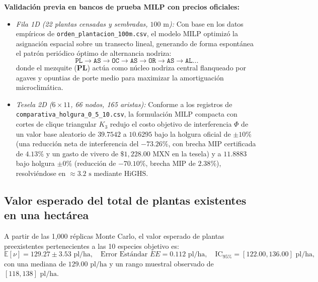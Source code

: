 \documentclass[11pt,a4paper]{article}
\begin{document}
\textbf{Validación previa en bancos de prueba MILP con precios oficiales:}
\begin{itemize}[leftmargin=1.5em]
    \item \textit{Fila 1D (22 plantas censadas y sembradas, $100\text{ m}$):} Con base en los datos empíricos de \texttt{orden\_plantacion\_100m.csv}, el modelo MILP optimizó la asignación espacial sobre un transecto lineal, generando de forma espontánea el patrón periódico óptimo de alternancia nodriza:
    \begin{equation}
    \texttt{PL} \longrightarrow \texttt{AS} \longrightarrow \texttt{OC} \longrightarrow \texttt{AS} \longrightarrow \texttt{OR} \longrightarrow \texttt{AS} \longrightarrow \texttt{AL} \dots
    \end{equation}
    donde el mezquite (\textbf{PL}) actúa como núcleo nodriza central flanqueado por agaves y opuntias de porte medio para maximizar la amortiguación microclimática.
    \item \textit{Tesela 2D ($6\times 11$, 66 nodos, 165 aristas):} Conforme a los registros de \texttt{comparativa\_holgura\_0\_5\_10.csv}, la formulación MILP compacta con cortes de clique triangular $K_3$ redujo el costo objetivo de interferencia $\Phi$ de un valor base aleatorio de $\mathbf{39.7542}$ a $\mathbf{10.6295}$ bajo la holgura oficial de $\pm 10\%$ (una reducción neta de interferencia del \textbf{$-73.26\%$}, con brecha MIP certificada de $\mathbf{4.13\%}$ y un gasto de vivero de $\$1,228.00\text{ MXN}$ en la tesela) y a $\mathbf{11.8883}$ bajo holgura $\pm 0\%$ (reducción de \textbf{$-70.10\%$}, brecha MIP de $\mathbf{2.38\%}$), resolviéndose en $\approx 3.2\text{ s}$ mediante HiGHS.
\end{itemize}

\subsection{Valor esperado del total de plantas existentes en una hectárea}
A partir de las 1,000 réplicas Monte Carlo, el valor esperado de plantas preexistentes pertenecientes a las 10 especies objetivo es:
\begin{equation}
\mathbb{E}[\nu] = 129.27 \pm 3.53\text{ pl/ha}, \quad \text{Error Estándar } EE = 0.112\text{ pl/ha}, \quad \text{IC}_{95\%} = [122.00, 136.00]\text{ pl/ha},
\end{equation}
con una mediana de $129.00\text{ pl/ha}$ y un rango muestral observado de $[118, 138]\text{ pl/ha}$.
\end{document}

